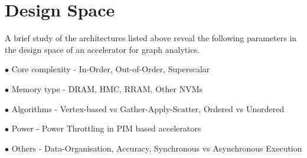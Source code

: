 \section{Design Space} \label{DesignSpace}
A brief study of the architectures listed above reveal the following parameters in the design space of an accelerator for graph analytics. 

\begin{description}
 \item{$\bullet$ Core complexity} - In-Order, Out-of-Order, Superscalar
 \item{$\bullet$ Memory type} - DRAM, HMC, RRAM, Other NVMs
 \item{$\bullet$ Algorithms} - Vertex-based \cite{Pregel} vs Gather-Apply-Scatter\cite{PowerGraph}, Ordered vs Unordered\cite{OvsUO}
 \item{$\bullet$ Power} - Power Throttling in PIM based accelerators\cite{PM3}
 \item{$\bullet$ Others} - Data-Organisation\cite{GraphP}, Accuracy\cite{GraphR}, Synchronous vs Asynchronous Execution\cite{Tesseract}
\end{description}
